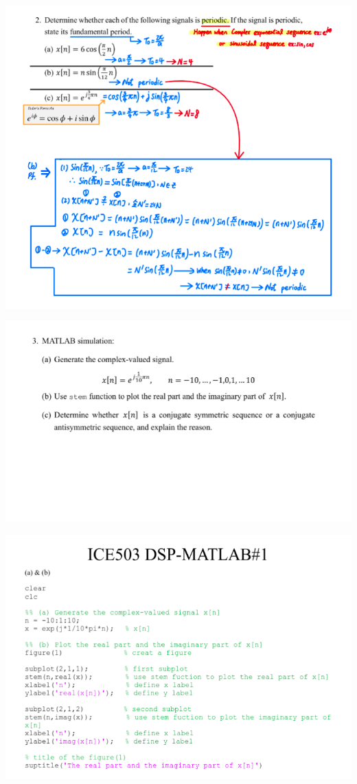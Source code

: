 \documentclass[a4paper]{article}
\begin{document}
	\begin{center}
		\includegraphics[width=1\linewidth]{screenshot003}
	\end{center}
	
	\begin{center}
		\includegraphics[width=1\linewidth]{screenshot004}
	\end{center}
	
	
	\begin{center}
		\includegraphics[width=1\linewidth]{screenshot006}
	\end{center}
	
\end{document}
